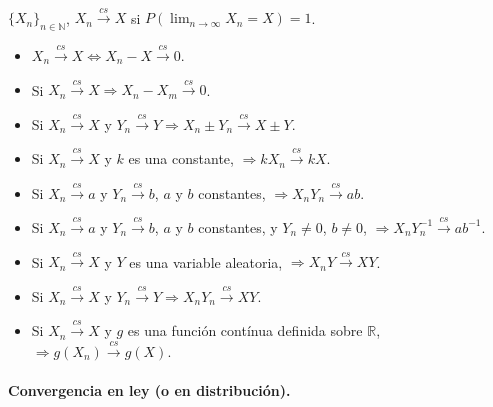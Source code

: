 \documentclass[oneside,spanish,a4paper]{article}
\begin{document}
~\\$\{X_n\}_{n\in \mathbb{N}}$, $X_n\overset{cs}{\to}X$ si $P\left(\lim_{n\to\infty}X_n=X\right)=1$.
\begin{itemize}
\item $X_n\overset{cs}{\to}X\Leftrightarrow X_n-X\overset{cs}{\to}0$.
\item Si $X_n\overset{cs}{\to}X\Rightarrow  X_n-X_m\overset{cs}{\to}0$.
\item Si $X_n\overset{cs}{\to}X$ y $Y_n\overset{cs}{\to}Y\Rightarrow X_n\pm Y_n\overset{cs}{\to}X\pm Y$.
\item Si $X_n\overset{cs}{\to}X$ y $k$ es una constante, $\Rightarrow kX_n\overset{cs}{\to}kX$.\item Si $X_n\overset{cs}{\to}a$ y $Y_n\overset{cs}{\to}b$, $a$ y $b$ constantes, $\Rightarrow X_nY_n\overset{cs}{\to}ab$.
\item Si $X_n\overset{cs}{\to}a$ y $Y_n\overset{cs}{\to}b$, $a$ y $b$ constantes, y $Y_n\neq0$, $b\neq0$, $\Rightarrow X_nY_n^{-1}\overset{cs}{\to}ab^{-1}$.
\item Si $X_n\overset{cs}{\to}X$ y $Y$ es una variable aleatoria, $\Rightarrow X_nY\overset{cs}{\to}XY$.
\item Si $X_n\overset{cs}{\to}X$ y $Y_n\overset{cs}{\to}Y\Rightarrow X_nY_n\overset{cs}{\to}XY$.
\item Si $X_n\overset{cs}{\to}X$ y $g$ es una funci\'on cont\'inua definida sobre $\mathbb{R}$, $\Rightarrow g(X_n)\overset{cs}{\to}g(X)$.
\end{itemize}

\paragraph{Convergencia en ley (o en distribuci\'on).}
\end{document}

